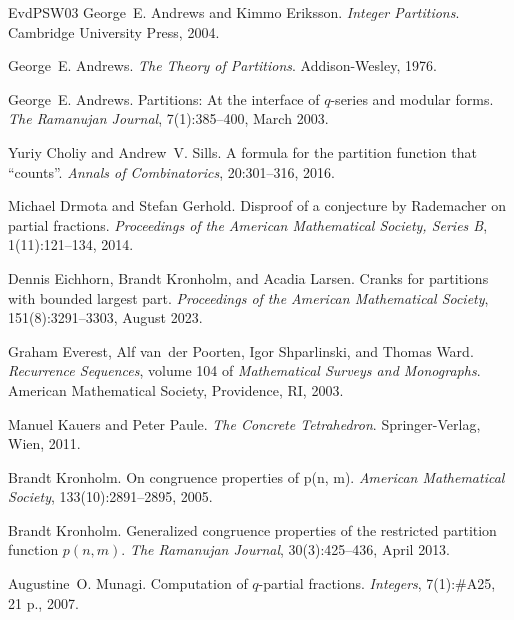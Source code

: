\documentclass[11pt]{article}
\theoremstyle{plain}
\theoremstyle{definition}
\begin{document}
\begin{thebibliography}{EvdPSW03}
  George~E. Andrews and Kimmo Eriksson.
  {\newblock}\textit{Integer Partitions}. {\newblock}Cambridge University
  Press, 2004.
  
  George~E. Andrews. {\newblock}\textit{The
  Theory of Partitions}. {\newblock}Addison-Wesley, 1976.
  
  George~E. Andrews. {\newblock}Partitions:
  At the interface of $q$-series and modular forms. {\newblock}\textit{The
  Ramanujan Journal}, 7(1):385--400, March 2003.
  
  Yuriy Choliy and Andrew~V. Sills.
  {\newblock}A formula for the partition function that ``counts''.
  {\newblock}\textit{Annals of Combinatorics}, 20:301--316, 2016.
  
  Michael Drmota and Stefan Gerhold.
  {\newblock}Disproof of a conjecture by Rademacher on partial fractions.
  {\newblock}\textit{Proceedings of the American Mathematical Society,
  Series B}, 1(11):121--134, 2014.
  
  Dennis Eichhorn, Brandt Kronholm, and Acadia
  Larsen. {\newblock}Cranks for partitions with bounded largest part.
  {\newblock}\textit{Proceedings of the American Mathematical Society},
  151(8):3291--3303, August 2023.
  
  Graham Everest, Alf van~der Poorten, Igor
  Shparlinski, and Thomas Ward. {\newblock}\textit{Recurrence Sequences},
  volume 104 of \textit{Mathematical Surveys and Monographs}.
  {\newblock}American Mathematical Society, Providence, RI, 2003.
  
  Manuel Kauers and Peter Paule.
  {\newblock}\textit{The Concrete Tetrahedron}. {\newblock}Springer-Verlag,
  Wien, 2011.
  
  Brandt Kronholm. {\newblock}On congruence
  properties of p(n, m). {\newblock}\textit{American Mathematical Society},
  133(10):2891--2895, 2005.
  
  Brandt Kronholm. {\newblock}Generalized
  congruence properties of the restricted partition function $p (n, m)$.
  {\newblock}\textit{The Ramanujan Journal}, 30(3):425--436, April 2013.
  
  Augustine~O. Munagi. {\newblock}Computation
  of $q$-partial fractions. {\newblock}\textit{Integers}, 7(1):\#A25, 21 p.,
  2007.
  

\end{thebibliography}
\end{document}
